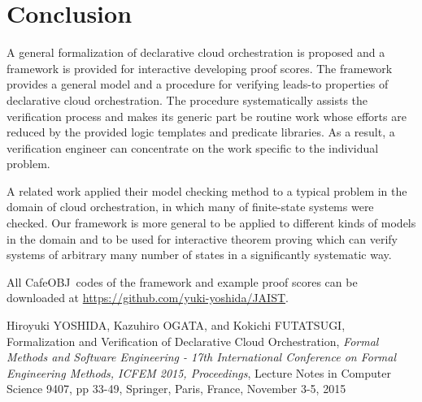 \documentclass[12pt]{report}
\newcommand{\cafeobj}{{\sf CafeOBJ}~}
\begin{document}
\section{Conclusion}
A general formalization of declarative cloud orchestration is proposed
and a framework is provided for interactive developing proof
scores. The framework provides a general model and a procedure for
verifying leads-to properties of declarative cloud orchestration.  The
procedure systematically assists the verification process and makes
its generic part be routine work whose efforts are reduced by the
provided logic templates and predicate libraries. As a result, a
verification engineer can concentrate on the work specific to the
individual problem.

A related work applied their model checking method to a typical
problem in the domain of cloud orchestration, in which many of
finite-state systems were checked. Our framework is more general to be
applied to different kinds of models in the domain and to be used for
interactive theorem proving which can verify systems of arbitrary many
number of states in a significantly systematic way.

All \cafeobj codes of the framework and example proof scores
can be downloaded at \url{https://github.com/yuki-yoshida/JAIST}.

\appendix




\begin{publication}

\item
Hiroyuki YOSHIDA, Kazuhiro OGATA, and Kokichi FUTATSUGI,
Formalization and Verification of Declarative Cloud Orchestration,
\emph{Formal Methods and Software Engineering - 17th International Conference
               on Formal Engineering Methods, {ICFEM} 2015, Proceedings}, 
Lecture Notes in Computer Science 9407,
pp 33-49, 
Springer,
Paris, France,
November 3-5, 2015

\end{publication}
\end{document}
